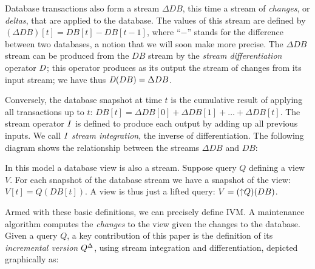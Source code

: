 Database transactions also form a stream $\Delta DB$, this time a
stream of \emph{changes}, or \emph{deltas}, that are applied to the
database.  The values of this stream are defined by $(\Delta DB)[t] =
DB[t] - DB[t-1]$, where ``$-$'' stands for the difference between two
databases, a notion that we will soon make more precise.  The $\Delta
DB$ stream can be produced from the $DB$ stream by the \emph{stream
differentiation} operator $\mathit{D}$; this operator produces as its output
the stream of changes from its input stream; we have thus $\mathit{D}(DB) =
\Delta DB$.

Conversely, the database snapshot at time $t$ is the cumulative result
of applying all transactions up to $t$: $DB[t] = \Delta DB[0] + \Delta
DB[1] + \ldots + \Delta DB[t]$.  The stream operator $\mathit{I}$ is defined
to produce each output by adding up all previous inputs.  We call $\mathit{I}$
\emph{stream integration}, the inverse of differentiation.  The
following diagram shows the relationship between the streams $\Delta
DB$ and $DB$:
\begin{center}
\end{center}

In this model a database view is also a stream.  Suppose query $Q$
defining a view $V$.  For each snapshot of the database stream we have
a snapshot of the view: $V[t] = Q(DB[t])$.  A view is thus just a
lifted query: $V = ({\uparrow}Q)(DB)$.

Armed with these basic definitions, we can precisely define IVM.  A
maintenance algorithm computes the \emph{changes} to the view given
the changes to the database. Given a query $Q$, a key contribution of
this paper is the definition of its \emph{incremental version}
${Q}^{\Delta}$, using stream integration and differentiation, depicted
graphically as:

%
\begin{center}
\end{center}

